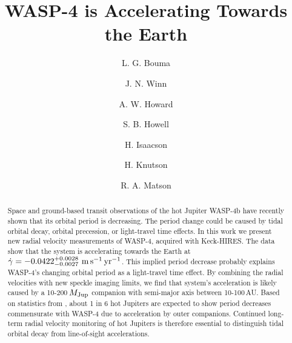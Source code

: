 \documentclass[12pt,twocolumn,tighten]{aastex62}
\begin{document}

\title{WASP-4 is Accelerating Towards the Earth}


%
%
\author[0000-0002-0514-5538]{L. G. Bouma}
%
\author[0000-0002-4265-047X]{J. N. Winn}

%
%
\author[0000-0001-8638-0320]{A. W. Howard}
%
\author{S. B. Howell}
%
\author[0000-0002-0531-1073]{H. Isaacson}
%
\author{H. Knutson}
%
\author{R. A. Matson}
%

\begin{abstract}
  Space and ground-based transit observations of the hot Jupiter
  WASP-4b have recently shown that its orbital period is decreasing.
  The period change could be caused by tidal orbital decay, orbital
  precession, or light-travel time effects.  In this work we present
  new radial velocity measurements of WASP-4, acquired with
  Keck-HIRES.  The data show that the system is accelerating towards
  the Earth at $\dot{\gamma} = -0.0422^{+0.0028}_{-0.0027}\ {\rm
  m}\,{\rm s}^{-1}\,{\rm yr}^{-1}$.  This implied period decrease
  probably explains WASP-4's changing orbital period as a light-travel
  time effect.  By combining the radial velocities with new speckle
  imaging limits, we find that system's acceleration is likely caused
  by a 10-200$\,M_{\rm Jup}$ companion with semi-major axis between
  10-100$\,$AU.  Based on statistics from
  \citet{knutson_friends_2014}, about 1 in 6 hot Jupiters are expected
  to show period decreases commensurate with WASP-4 due to
  acceleration by outer companions.  Continued long-term radial
  velocity monitoring of hot Jupiters is therefore essential to
  distinguish tidal orbital decay from line-of-sight accelerations.
\end{abstract}
\end{document}
